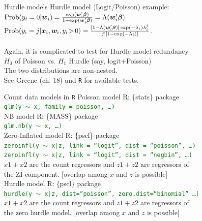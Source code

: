 \documentclass[usenames,dvipsnames]{beamer}
\begin{document}
\begin{frame}{Hurdle models}
Hurdle model (Logit/Poisson) example:\\
\bigskip
$\textnormal{Prob}(y_i=0|\bm{w}_i) = \frac{\exp(\bm{w}_i^{\prime}\bm{\beta})}{1+\exp(\bm{w}_i^{\prime}\bm{\beta})} = \Lambda(\bm{w}_i^{\prime}\bm{\beta}) $\\
\bigskip
$\textnormal{Prob}(y_i=j|\bm{x}_i,\bm{w}_i, y_i\!>\!0) = \frac{[1-\Lambda(\bm{w}_i^{\prime}\bm{\beta})]\exp(-\lambda_i)\lambda_i^j}{j![1-\exp(-\lambda_i)]}$.\\
~\\
\bigskip
Again, it is complicated to test for Hurdle model redundancy \\$H_0$ of Poisson vs. $H_1$ Hurdle (say, logit+Poisson) \\
\medskip
The two distributions are non-nested. \\
See Greene (ch. 18) and \texttt{R} for available tests.
\end{frame}
\begin{frame}{Count data models in  \texttt{R}}
Poisson model \qquad \qquad R: \{stats\} package\\
\texttt{\textcolor{Green}{glm(y $\sim$ x, family = poisson, \dots )}}\\
\vspace*{.4cm}
NB model \qquad \qquad \qquad R: \{MASS\} package\\
\texttt{\textcolor{Green}{glm.nb(y $\sim$ x, \dots)}} \\
\vspace*{.4cm}
Zero-Inflated model \qquad R: \{pscl\} package\\
\small{\texttt{\textcolor{Green}{zeroinfl(y $\sim$ x|z, link = ``logit'', dist = ``poisson'', \dots)}}} \\
\small{\texttt{\texttt{\textcolor{Green}{zeroinfl(y $\sim$ x|z, link = ``logit'', dist = ``negbin'', \dots)}}}} \\
\qquad $x1+x2$ are the count regressors and $z1+z2$ are regressors of\\ 
\qquad the ZI component. $[$overlap among $x$ and $z$ is possible$]$\\
\vspace*{.4cm}
Hurdle model \qquad \qquad \qquad R: \{pscl\} package\\
\small{\texttt{\textcolor{Green}{hurdle(y $\sim$ x|z, dist=``poisson'', zero.dist=``binomial'' \dots)}}} \\
\qquad $x1+x2$ are the count regressors and $z1+z2$ are regressors of\\ 
\qquad the zero hurdle model. $[$overlap among $x$ and $z$ is possible$]$
\end{frame}
\end{document}
